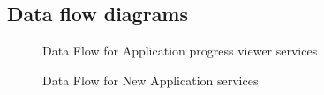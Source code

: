 \documentclass[12pt]{article}
\begin{document}
\subsection{Data flow diagrams}
\begin{figure}[H]
\centering	
{}
\caption{Data Flow for Application progress viewer services}
\end{figure}

\begin{figure}[H]
\centering	
{}
\caption{Data Flow for New Application services}
\end{figure}
\end{document}
